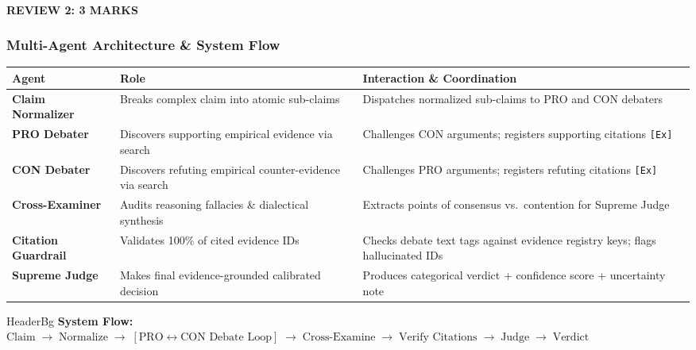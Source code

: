 \documentclass[aspectratio=169, 10pt]{beamer}
\begin{document}
\begin{frame}
    \framesubtitle{REVIEW 2: 3 MARKS}
    \frametitle{Multi-Agent Architecture \& System Flow}
    \vspace{-0.1cm}
    \setlength{\tabcolsep}{4pt}
    \renewcommand{\arraystretch}{1.10}
    \scriptsize
    \noindent
    \begin{tabularx}{\textwidth}{l p{4.0cm} >{\raggedright\arraybackslash}X}
        \toprule
        \rowcolor{HeaderBg}
        \textbf{Agent} & \textbf{Role} & \textbf{Interaction \& Coordination} \\
        \midrule
        \textbf{Claim Normalizer} & Breaks complex claim into atomic sub-claims & Dispatches normalized sub-claims to PRO and CON debaters \\
        \rowcolor{RowAlt}
        \textbf{PRO Debater} & Discovers supporting empirical evidence via search & Challenges CON arguments; registers supporting citations \texttt{[Ex]} \\
        \textbf{CON Debater} & Discovers refuting empirical counter-evidence via search & Challenges PRO arguments; registers refuting citations \texttt{[Ex]} \\
        \rowcolor{RowAlt}
        \textbf{Cross-Examiner} & Audits reasoning fallacies \& dialectical synthesis & Extracts points of consensus vs.\ contention for Supreme Judge \\
        \textbf{Citation Guardrail} & Validates 100\% of cited evidence IDs & Checks debate text tags against evidence registry keys; flags hallucinated IDs \\
        \rowcolor{RowAlt}
        \textbf{Supreme Judge} & Makes final evidence-grounded calibrated decision & Produces categorical verdict + confidence score + uncertainty note \\
        \bottomrule
    \end{tabularx}
    
    \vspace{0.25cm}
    \begin{beamercolorbox}[wd=\textwidth, sep=0.18cm, rounded=false]{HeaderBg}
        \centering\scriptsize\textbf{\color{NavyDark}System Flow:} \quad
        $\text{Claim} \;\longrightarrow\; \text{Normalize} \;\longrightarrow\; [\text{PRO} \longleftrightarrow \text{CON Debate Loop}] \;\longrightarrow\; \text{Cross-Examine} \;\longrightarrow\; \text{Verify Citations} \;\longrightarrow\; \text{Judge} \;\longrightarrow\; \text{Verdict}$
    \end{beamercolorbox}
\end{frame}
\end{document}
